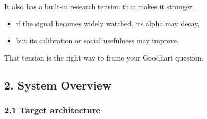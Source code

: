 \documentclass[
]{article}
\providecommand{\tightlist}{%
  \setlength{\itemsep}{0pt}\setlength{\parskip}{0pt}}
\begin{document}
It also has a built-in research tension that makes it stronger:

\begin{itemize}
\tightlist
\item
  if the signal becomes widely watched, its alpha may decay,
\item
  but its calibration or social usefulness may improve.
\end{itemize}

That tension is the right way to frame your Goodhart question.

\subsection{2. System Overview}\label{2-system-overview}

\subsubsection{2.1 Target architecture}\label{21-target-architecture}
\end{document}
